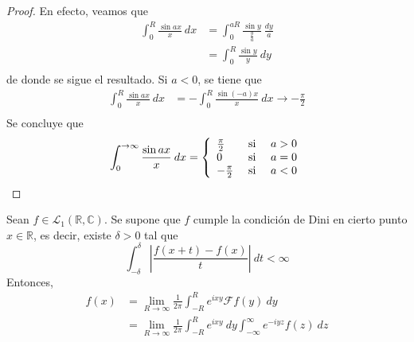 \documentclass[12pt]{report}
\theoremstyle{largebreak}
\newcommand\abs[1]{\ensuremath{\left|#1\right|}}
\newcommand{\fou}[1]{\ensuremath{\mathcal{F}#1}}
\begin{document}
    \begin{proof}
        En efecto, veamos que
        \begin{equation*}
            \begin{split}
                \int_0^R\frac{\sin ax}{x}\:dx&=\int_0^{aR}\frac{\sin y}{\frac{y}{a}}\:\frac{dy}{a}\\
                &=\int_0^R \frac{\sin y}{y}\:dy\\
            \end{split}
        \end{equation*}
        de donde se sigue el resultado. Si $a<0$, se tiene que
        \begin{equation*}
            \begin{split}
                \int_0^R\frac{\sin ax}{x}\:dx&=-\int_0^R\frac{\sin (-a)x}{x}\:dx\longrightarrow -\frac{\pi}{2}\\
            \end{split}
        \end{equation*}
        Se concluye que
        \begin{equation*}
            \int_0^{ \rightarrow\infty}\frac{\sin ax}{x}\:dx=\left\{
                \begin{array}{lcr}
                    \frac{\pi}{2} & \textup{ si } & a>0\\
                    0 & \textup{ si } & a=0\\
                    -\frac{\pi}{2} & \textup{ si } & a<0\\
                \end{array}
            \right.
        \end{equation*}
    \end{proof}

    \begin{theor}
        Sean $f\in\mathcal{L}_1(\mathbb{R},\mathbb{C})$. Se supone que $f$ cumple la condición de Dini en cierto punto $x\in\mathbb{R}$, es decir, existe $\delta>0$ tal que
        \begin{equation*}
            \int_{-\delta}^\delta\abs{\frac{f(x+t)-f(x)}{t}}\:dt<\infty
        \end{equation*}
        Entonces,
        \begin{equation*}
            \begin{split}
                f(x)&=\lim_{ R\rightarrow\infty}\frac{1}{2\pi}\int_{ -R}^{ R}e^{ixy}\fou{f}(y)\:dy\\
                &=\lim_{ R\rightarrow\infty}\frac{1}{2\pi}\int_{ -R}^{ R}e^{ixy}\:dy\int_{-\infty}^\infty e^{ -iyz}f(z)\:dz \\
            \end{split}
        \end{equation*}
    \end{theor}
    
\end{document}
